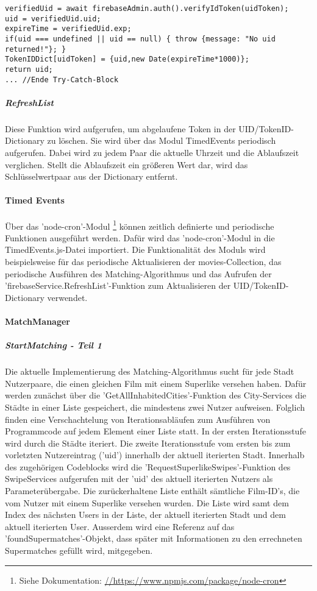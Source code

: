 \begin{lstlisting}[caption=Firebase-Service Register, label=lst:firebaseServiceRegister]
verifiedUid = await firebaseAdmin.auth().verifyIdToken(uidToken);
uid = verifiedUid.uid;
expireTime = verifiedUid.exp;
if(uid === undefined || uid == null) { throw {message: "No uid returned!"}; }
TokenIDDict[uidToken] = {uid,new Date(expireTime*1000)};
return uid;
... //Ende Try-Catch-Block
\end{lstlisting}
   
\noindent
\subparagraph{RefreshList}
Diese Funktion wird aufgerufen, um abgelaufene Token in der UID/TokenID-Dictionary zu löschen. Sie wird über das Modul TimedEvents periodisch aufgerufen. Dabei wird zu jedem Paar die aktuelle Uhrzeit und die Ablaufszeit verglichen. Stellt die Ablaufszeit ein größeren Wert dar, wird das Schlüsselwertpaar aus der Dictionary entfernt.

\paragraph{Timed Events}
Über das 'node-cron'-Modul \footnote{Siehe Dokumentation: \url{//https://www.npmjs.com/package/node-cron}}
können zeitlich definierte und periodische Funktionen ausgeführt werden. Dafür wird das 'node-cron'-Modul in die TimedEvents.js-Datei importiert. Die Funktionalität des Moduls wird beispielsweise für das periodische Aktualisieren der movies-Collection, das periodische Ausführen des Matching-Algorithmus und das Aufrufen der 'firebaseService.RefreshList'-Funktion zum Aktualisieren der UID/TokenID-Dictionary verwendet.

\paragraph{MatchManager}
\noindent
\subparagraph{StartMatching - Teil 1}
Die aktuelle Implementierung des Matching-Algorithmus sucht für jede Stadt Nutzerpaare, die einen gleichen Film mit einem Superlike versehen haben. Dafür werden zunächst über die 'GetAllInhabitedCities'-Funktion des City-Services die Städte in einer Liste gespeichert, die mindestens zwei Nutzer aufweisen. Folglich finden eine Verschachtelung von Iterationsabläufen zum Ausführen von Programmcode auf jedem Element einer Liste statt.
In der ersten Iterationsstufe wird durch die Städte iteriert.
Die zweite Iterationsstufe vom ersten bis zum vorletzten Nutzereintrag ('uid') innerhalb der aktuell iterierten Stadt. Innerhalb des zugehörigen Codeblocks wird die 'RequestSuperlikeSwipes'-Funktion des SwipeServices aufgerufen mit der 'uid' des aktuell iterierten Nutzers als Parameterübergabe. Die zurückerhaltene Liste enthält sämtliche Film-ID's, die vom Nutzer mit einem Superlike versehen wurden. Die Liste wird samt dem Index des nächsten Users in der Liste, der aktuell iterierten Stadt und dem aktuell iterierten User. Ausserdem wird eine Referenz auf das 'foundSupermatches'-Objekt, dass später mit Informationen zu den errechneten Supermatches gefüllt wird, mitgegeben.

